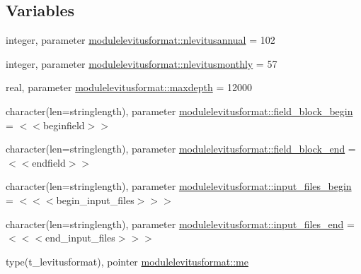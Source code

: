 \subsection*{Variables}
\begin{DoxyCompactItemize}
\item 
integer, parameter \mbox{\hyperlink{namespacemodulelevitusformat_a3edc6e1738bc17572f3b07705f142bd4}{modulelevitusformat\+::nlevitusannual}} = 102
\item 
integer, parameter \mbox{\hyperlink{namespacemodulelevitusformat_a64890904e5c28f0e6abc308dbe4130e7}{modulelevitusformat\+::nlevitusmonthly}} = 57
\item 
real, parameter \mbox{\hyperlink{namespacemodulelevitusformat_a229f9d8dbe6c9ecd28b7dce69d7c6854}{modulelevitusformat\+::maxdepth}} = 12000
\item 
character(len=stringlength), parameter \mbox{\hyperlink{namespacemodulelevitusformat_a9af934d53d17b725109ed386a7682f11}{modulelevitusformat\+::field\+\_\+block\+\_\+begin}} = \textquotesingle{}$<$$<$beginfield$>$$>$\textquotesingle{}
\item 
character(len=stringlength), parameter \mbox{\hyperlink{namespacemodulelevitusformat_ad8c1adba13150b2f1cd175c21286c020}{modulelevitusformat\+::field\+\_\+block\+\_\+end}} = \textquotesingle{}$<$$<$endfield$>$$>$\textquotesingle{}
\item 
character(len=stringlength), parameter \mbox{\hyperlink{namespacemodulelevitusformat_ad4ad30b5b6f7cc543e84c4be601d151e}{modulelevitusformat\+::input\+\_\+files\+\_\+begin}} = \textquotesingle{}$<$$<$$<$begin\+\_\+input\+\_\+files$>$$>$$>$\textquotesingle{}
\item 
character(len=stringlength), parameter \mbox{\hyperlink{namespacemodulelevitusformat_a048869c603072e08395f86eedfa8e608}{modulelevitusformat\+::input\+\_\+files\+\_\+end}} = \textquotesingle{}$<$$<$$<$end\+\_\+input\+\_\+files$>$$>$$>$\textquotesingle{}
\item 
type(t\+\_\+levitusformat), pointer \mbox{\hyperlink{namespacemodulelevitusformat_a9c909f12809cc941f33fabebbea18d55}{modulelevitusformat\+::me}}
\end{DoxyCompactItemize}
